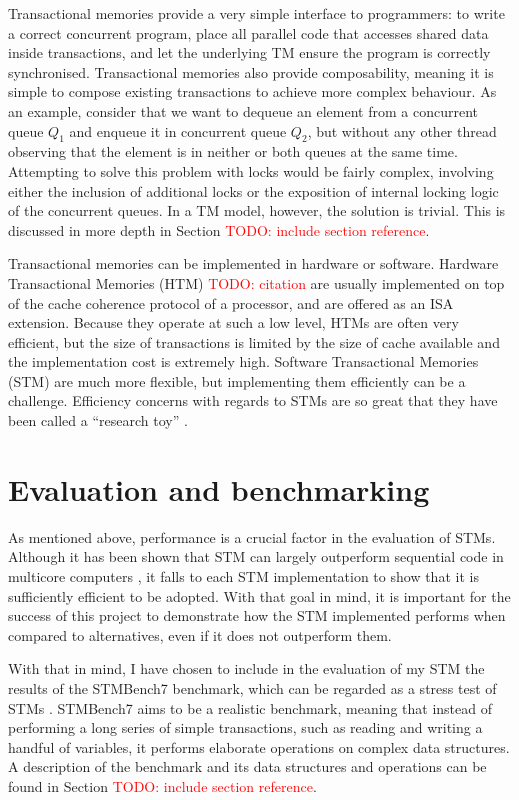\documentclass[12pt,a4paper,oneside,openright]{report}
\newcommand{\todo}[1]{\textcolor{red}{TODO: #1}}
\begin{document}
Transactional memories provide a very simple interface to programmers:
to write a correct concurrent program, place all parallel code that
accesses shared data inside transactions, and let the underlying TM
ensure the program is correctly synchronised. Transactional memories
also provide composability, meaning it is simple to compose existing
transactions to achieve more complex behaviour. As an example,
consider that we want to dequeue an element from a concurrent queue
$Q_1$ and enqueue it in concurrent queue $Q_2$, but without any other
thread observing that the element is in neither or both queues at the
same time. Attempting to solve this problem with locks would be fairly
complex, involving either the inclusion of additional locks or the
exposition of internal locking logic of the concurrent queues. In a TM
model, however, the solution is trivial. This is discussed in more
depth in Section \todo{include section reference}.

Transactional memories can be implemented in hardware or
software. Hardware Transactional Memories (HTM) \todo{citation} are
usually implemented on top of the cache coherence protocol of a
processor, and are offered as an ISA extension. Because they operate
at such a low level, HTMs are often very efficient, but the size of
transactions is limited by the size of cache available and the
implementation cost is extremely high. Software Transactional Memories
(STM) \cite{STM} are much more flexible, but implementing them
efficiently can be a challenge. Efficiency concerns with regards to
STMs are so great that they have been called a ``research toy''
\cite{Toy}.

\section{Evaluation and benchmarking}
\label{sec:eval-benchm}

As mentioned above, performance is a crucial factor in the evaluation
of STMs. Although it has been shown that STM can largely outperform
sequential code in multicore computers \cite{MoreThanToy}, it falls to
each STM implementation to show that it is sufficiently efficient to
be adopted. With that goal in mind, it is important for the success of
this project to demonstrate how the STM implemented performs when
compared to alternatives, even if it does not outperform them.

With that in mind, I have chosen to include in the evaluation of my
STM the results of the STMBench7 benchmark, which can be regarded as a
stress test of STMs \cite{STMBench7}. STMBench7 aims to be a realistic
benchmark, meaning that instead of performing a long series of simple
transactions, such as reading and writing a handful of variables, it
performs elaborate operations on complex data structures. A
description of the benchmark and its data structures and operations
can be found in Section \todo{include section reference}.
\end{document}
